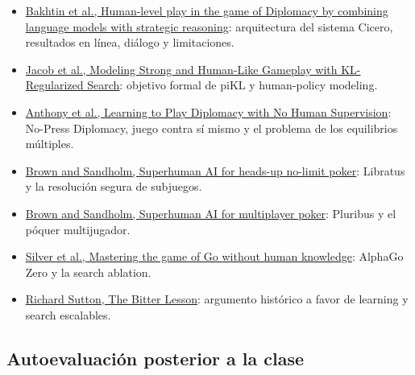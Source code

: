 \begin{itemize}
  \item \href{https://www.science.org/doi/full/10.1126/science.ade9097}{Bakhtin et al., Human-level play in the game of Diplomacy by combining language models with strategic reasoning}: arquitectura del sistema Cicero, resultados en línea, diálogo y limitaciones.
  \item \href{https://proceedings.mlr.press/v162/jacob22a.html}{Jacob et al., Modeling Strong and Human-Like Gameplay with KL-Regularized Search}: objetivo formal de piKL y human-policy modeling.
  \item \href{https://proceedings.neurips.cc/paper/2021/hash/95f2b84de5660ddf45c8a34933a2e66f-Abstract.html}{Anthony et al., Learning to Play Diplomacy with No Human Supervision}: No-Press Diplomacy, juego contra sí mismo y el problema de los equilibrios múltiples.
  \item \href{https://www.science.org/doi/10.1126/science.aao1733}{Brown and Sandholm, Superhuman AI for heads-up no-limit poker}: Libratus y la resolución segura de subjuegos.
  \item \href{https://www.science.org/doi/10.1126/science.aay2400}{Brown and Sandholm, Superhuman AI for multiplayer poker}: Pluribus y el póquer multijugador.
  \item \href{https://www.science.org/doi/10.1126/science.aar6404}{Silver et al., Mastering the game of Go without human knowledge}: AlphaGo Zero y la search ablation.
  \item \href{http://www.incompleteideas.net/IncIdeas/BitterLesson.html}{Richard Sutton, The Bitter Lesson}: argumento histórico a favor de learning y search escalables.
\end{itemize}

\subsection{Autoevaluación posterior a la clase}

